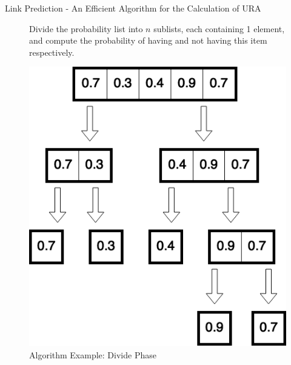 \documentclass[9pt]{beamer}
\begin{document}
\begin{frame}{Link Prediction - An Efficient Algorithm for the Calculation of URA}


\begin{figure}
Divide the probability list into $n$ sublists, each containing 1 element, and compute the probability of having and not having this item respectively.

\includegraphics[scale = 0.35]{5_sample_divide.png}
\centering
\caption{Algorithm Example: Divide Phase}
\label{example}
\end{figure}


\end{frame}
\end{document}

